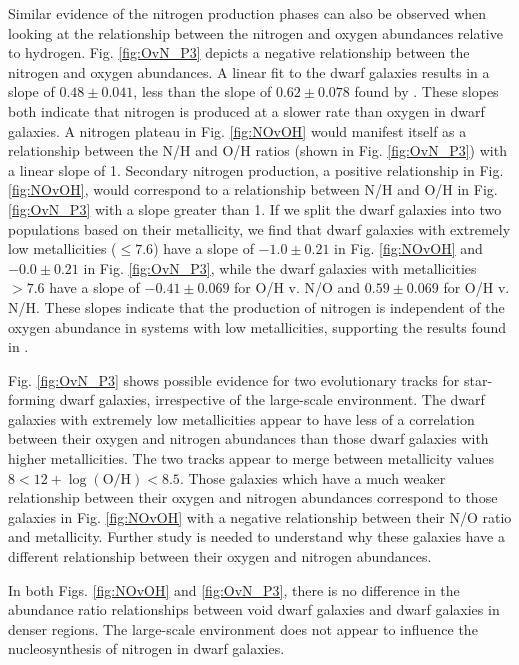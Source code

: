 Similar evidence of the nitrogen production phases can also be observed when 
looking at the relationship between the nitrogen and oxygen abundances relative 
to hydrogen.  Fig. \ref{fig:OvN_P3} depicts a negative relationship between the 
nitrogen and oxygen abundances.  A linear fit to the dwarf galaxies results in a 
slope of $0.48\pm 0.041$, less than the slope of $0.62\pm 0.078$ found by 
\cite{Douglass17b}.  These slopes both indicate that nitrogen is produced at a 
slower rate than oxygen in dwarf galaxies.  A nitrogen plateau in Fig. 
\ref{fig:NOvOH} would manifest itself as a relationship between the N/H and O/H 
ratios (shown in Fig. \ref{fig:OvN_P3}) with a linear slope of 1.  Secondary 
nitrogen production, a positive relationship in Fig. \ref{fig:NOvOH}, would 
correspond to a relationship between N/H and O/H in Fig. \ref{fig:OvN_P3} with a 
slope greater than 1.  If we split the dwarf galaxies into two populations based 
on their metallicity, we find that dwarf galaxies with extremely low 
metallicities (\OH $\leq 7.6$) have a slope of $-1.0\pm 0.21$ in Fig. 
\ref{fig:NOvOH} and $-0.0\pm 0.21$ in Fig. \ref{fig:OvN_P3}, while the dwarf 
galaxies with metallicities \OH $> 7.6$ have a slope of $-0.41\pm 0.069$ for O/H 
v. N/O and $0.59\pm 0.069$ for O/H v. N/H.  These slopes indicate that the 
production of nitrogen is independent of the oxygen abundance in systems with 
low metallicities, supporting the results found in \cite{Douglass17b}.

Fig. \ref{fig:OvN_P3} shows possible evidence for two evolutionary tracks for 
star-forming dwarf galaxies, irrespective of the large-scale environment.  The 
dwarf galaxies with extremely low metallicities appear to have less of a 
correlation between their oxygen and nitrogen abundances than those dwarf 
galaxies with higher metallicities.  The two tracks appear to merge between 
metallicity values $8 < 12 + \log(\text{O}/\text{H}) < 8.5$.  Those galaxies 
which have a much weaker relationship between their oxygen and nitrogen 
abundances correspond to those galaxies in Fig. \ref{fig:NOvOH} with a negative 
relationship between their N/O ratio and metallicity.  Further study is needed 
to understand why these galaxies have a different relationship between their 
oxygen and nitrogen abundances.

In both Figs. \ref{fig:NOvOH} and \ref{fig:OvN_P3}, there is no difference in 
the abundance ratio relationships between void dwarf galaxies and dwarf galaxies 
in denser regions.  The large-scale environment does not appear to influence the 
nucleosynthesis of nitrogen in dwarf galaxies.


